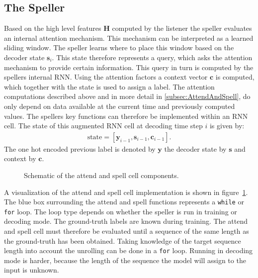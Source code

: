 \subsection{The Speller}
Based on the high level features $\mathbf{H}$ computed by the listener the speller evaluates an internal attention mechanism. This mechanism can be interpreted as a learned sliding window. The speller learns where to place this window based on the decoder state $\mathbf{s}_i$. This state therefore represents a query, which asks the attention mechanism to provide certain information. This query in turn is computed by the spellers internal RNN.  Using the attention factors a context vector $\mathbf{c}$ is computed, which together with the state is used to assign a label. 
The attention computations described above and in more detail in \ref{subsec:AttendAndSpell}, do only depend on data available at the current time and previously computed values. The spellers key functions can therefore be implemented within an RNN cell. The state of this augmented RNN cell at decoding time step $i$ is given by:
\begin{align}
\text{state} =  [\mathbf{y}_{i-1}, \mathbf{s}_{i-1}, \mathbf{c}_{i-1}].
\end{align}
The one hot encoded previous label is denoted by $\mathbf{y}$ the decoder state by $\mathbf{s}$ and context by $\mathbf{c}$.
\begin{figure}
\centering

\caption{Schematic of the attend and spell cell components.}
\label{fig:asCell}
\end{figure}
A visualization of the attend and spell cell implementation is shown in figure~\ref{fig:asCell}. The blue box surrounding the attend and spell functions represents a \texttt{while} or \texttt{for} loop. The loop type depends on whether the speller is run in training or decoding mode. 
The ground-truth labels are known during training. The attend and spell cell must therefore be evaluated until a sequence of the same length as the ground-truth has been obtained. Taking knowledge of the target sequence length into account the unrolling can be done in a \texttt{for} loop. 
Running in decoding mode is harder, because the length of the sequence the model will assign to the input is unknown. 

